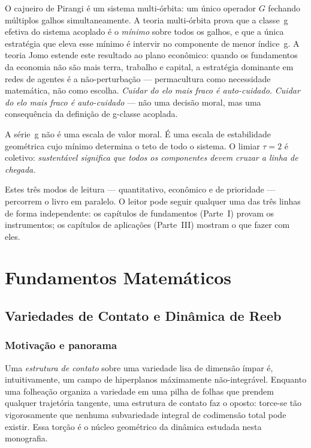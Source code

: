 \documentclass[12pt,a4paper,twoside]{book}
\theoremstyle{plain}
\theoremstyle{definition}
\theoremstyle{definition}
\begin{document}
O cajueiro de Pirangi é um sistema multi-órbita: um único operador $G$
fechando múltiplos galhos simultaneamente. A teoria multi-órbita \cite{GrossiMultiOrbit} prova que a classe~g
efetiva do sistema acoplado é o \emph{mínimo} sobre todos os galhos,
e que a única estratégia que eleva esse mínimo é intervir no componente
de menor índice~g. A teoria Jomo \cite{GrossiJomo} estende este resultado
ao plano econômico: quando os fundamentos da economia não são mais terra,
trabalho e capital, a estratégia dominante em redes de agentes é a
não-perturbação --- permacultura como necessidade matemática, não como
escolha. \emph{Cuidar do elo mais fraco é auto-cuidado.}
\emph{Cuidar do elo mais fraco é auto-cuidado} --- não uma decisão
moral, mas uma consequência da definição de g-classe acoplada.

A série~g não é uma escala de valor moral. É uma escala de estabilidade
geométrica cujo mínimo determina o teto de todo o sistema. O limiar
$\tau = 2$ é coletivo: \emph{sustentável significa que todos os
componentes devem cruzar a linha de chegada.}

\medskip\noindent
Estes três modos de leitura --- quantitativo, econômico e de prioridade
--- percorrem o livro em paralelo. O leitor pode seguir qualquer uma
das três linhas de forma independente: os capítulos de fundamentos
(Parte~I) provam os instrumentos; os capítulos de aplicações (Parte~III)
mostram o que fazer com eles.

\mainmatter

\part{Fundamentos Matemáticos}

\chapter{Variedades de Contato e Dinâmica de Reeb}
\label{cap:contato}

\section{Motivação e panorama}

Uma \emph{estrutura de contato} sobre uma variedade lisa de dimensão ímpar é,
intuitivamente, um campo de hiperplanos máximamente não-integrável. Enquanto
uma folheação organiza a variedade em uma pilha de folhas que prendem
qualquer trajetória tangente, uma estrutura de contato faz o oposto: torce-se
tão vigorosamente que nenhuma subvariedade integral de codimensão total
pode existir. Essa torção é o núcleo geométrico da dinâmica estudada nesta
monografia.
\end{document}
